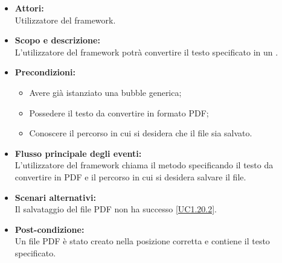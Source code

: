 \begin{itemize}
	\item \textbf{Attori:}
	\\Utilizzatore del framework.
	\item \textbf{Scopo e descrizione:} 
	\\L'utilizzatore del framework potrà convertire il testo specificato in un .
	\item \textbf{Precondizioni:}
	\begin{itemize}
		\item Avere già istanziato una bubble generica;
		\item Possedere il testo da convertire in formato PDF;
		\item Conoscere il percorso in cui si desidera che il file sia salvato.
	\end{itemize}
	\item \textbf{Flusso principale degli eventi:}
	\\L'utilizzatore del framework chiama il metodo specificando il testo da convertire in PDF e il percorso in cui si desidera salvare il file.
	\item \textbf{Scenari alternativi:}
	\\Il salvataggio del file PDF non ha successo \ref{UC1.20.2}.
	\item \textbf{Post-condizione:}
	\\Un file PDF è stato creato nella posizione corretta e contiene il testo specificato.
\end{itemize}


